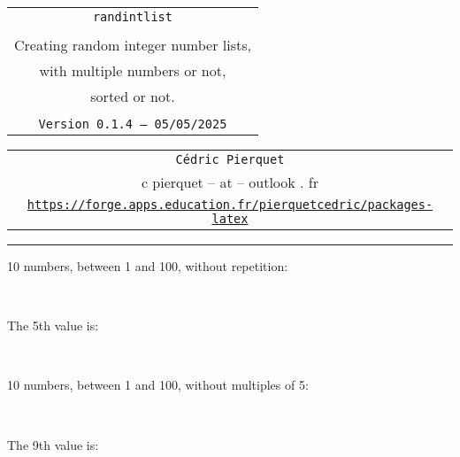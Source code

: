 \documentclass[11pt,a4paper]{ltxdoc}
\def\TPversion{0.1.4}
\def\TPdate{05/05/2025}
\begin{document}
\thispagestyle{empty}

\begin{center}
	\begin{minipage}{0.88\linewidth}
		\begin{tcolorbox}[colframe=yellow,colback=yellow!15]
			\begin{center}
				\renewcommand{\arraystretch}{1.25}%
				\begin{tabular}{c}
					{\Huge \texttt{randintlist}}\\
					\\
					{\LARGE Creating random integer number lists,} \\
					{\LARGE with multiple numbers or not,} \\
					{\LARGE sorted or not.} \\
					\\
					{\small \texttt{Version \TPversion{} -- \TPdate}}
				\end{tabular}
			\end{center}
		\end{tcolorbox}
	\end{minipage}
\end{center}

\begin{center}
	\begin{tabular}{c}
		\texttt{Cédric Pierquet}\\
		{\ttfamily c pierquet -- at -- outlook . fr}\\
		\texttt{\url{https://forge.apps.education.fr/pierquetcedric/packages-latex}} \\
	\end{tabular}
\end{center}

\hrule

\vfill

\begin{tcolorbox}[colframe=lightgray,colback=lightgray!5]
10 numbers, between 1 and 100, without repetition:

\hfill\randintlist[min=1,max=100,nb=10]{\mylist}\textcolor{red}{\mylist}\hfill~

The 5th value is:

\hfill\textcolor{blue}{}\hfill~
\end{tcolorbox}

\begin{tcolorbox}[colframe=lightgray,colback=lightgray!5]
10 numbers, between 1 and 100, without multiples of 5:

\hfill\randintlist[min=1,max=100,nb=10,exclude={5,10,15,20,25,30,35,40,45,50,55,60,65,70,75,80,85,90,95,100}]{\mylist}\textcolor{olive}{\mylist}\hfill~

The 9th value is:

\hfill\textcolor{purple}{}\hfill~
\end{tcolorbox}
\end{document}
